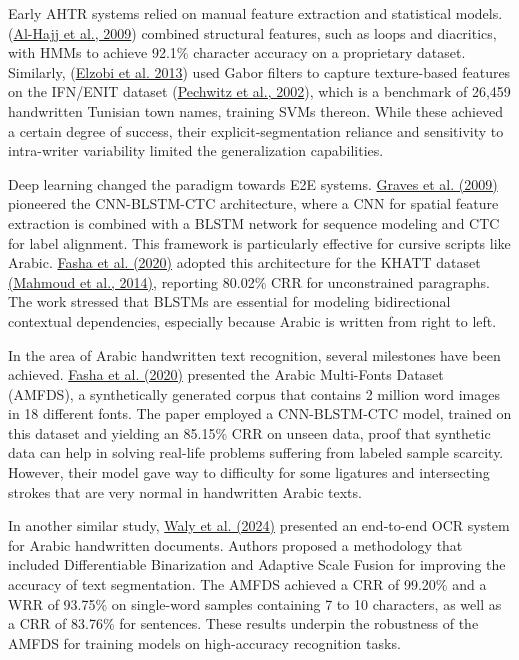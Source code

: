 Early AHTR systems relied on manual feature extraction and statistical models.(\hyperref[AlHajj2009]{Al-Hajj et al., 2009})
 combined structural features, such as loops and diacritics, with HMMs to achieve 92.1\% character accuracy on a proprietary dataset. Similarly, (\hyperref[Elzobi2013]{Elzobi et al. 2013}) used Gabor filters to capture texture-based features on the IFN/ENIT dataset (\hyperref[Pechwitz2002]{Pechwitz et al., 2002}), which is a benchmark of 26,459 handwritten Tunisian town names, training SVMs thereon. While these achieved a certain degree of success, their explicit-segmentation reliance and sensitivity to intra-writer variability limited the generalization capabilities.



Deep learning changed the paradigm towards E2E systems. \hyperref[Graves2009]{Graves et al. (2009)} pioneered the CNN-BLSTM-CTC architecture, where a CNN for spatial feature extraction is combined with a BLSTM network for sequence modeling and CTC for label alignment. This framework is particularly effective for cursive scripts like Arabic. \hyperref[Fasha2020]{Fasha et al. (2020)} adopted this architecture for the KHATT dataset \hyperref[Mahmoud2014]{(Mahmoud et al., 2014)}, reporting 80.02\% CRR for unconstrained paragraphs. The work stressed that BLSTMs are essential for modeling bidirectional contextual dependencies, especially because Arabic is written from right to left.

In the area of Arabic handwritten text recognition, several milestones have been achieved. \hyperref[Fasha2020]{Fasha et al. (2020)} presented the Arabic Multi-Fonts Dataset (AMFDS), a synthetically generated corpus that contains 2 million word images in 18 different fonts. The paper employed a CNN-BLSTM-CTC model, trained on this dataset and yielding an 85.15\% CRR on unseen data, proof that synthetic data can help in solving real-life problems suffering from labeled sample scarcity. However, their model gave way to difficulty for some ligatures and intersecting strokes that are very normal in handwritten Arabic texts.

In another similar study, \hyperref[Waly2024]{Waly et al. (2024)} presented an end-to-end OCR system for Arabic handwritten documents. Authors proposed a methodology that included Differentiable Binarization and Adaptive Scale Fusion for improving the accuracy of text segmentation. The AMFDS achieved a CRR of 99.20\% and a WRR of 93.75\% on single-word samples containing 7 to 10 characters, as well as a CRR of 83.76\% for sentences. These results underpin the robustness of the AMFDS for training models on high-accuracy recognition tasks.

